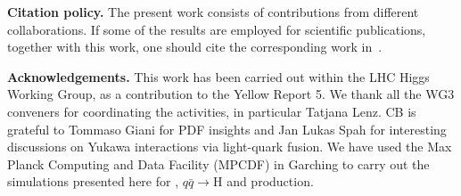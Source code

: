 \documentclass[11pt,a4paper]{article}
\begin{document}
\textbf{Citation policy. }The present work consists of contributions from different collaborations. If some of the results are employed for scientific publications, together with this work, one should cite the corresponding work in~.

\textbf{Acknowledgements. }This work has been carried out within the LHC Higgs Working Group, as a contribution to the Yellow Report 5. We thank all the WG3 conveners for coordinating the activities, in particular Tatjana Lenz. CB is grateful to Tommaso Giani for PDF insights and Jan Lukas Spah for interesting discussions on Yukawa interactions via light-quark fusion. We have used the Max Planck Computing and Data Facility (MPCDF) in Garching to carry out the \minnlo{} simulations presented here for \bbtoH{}, $q\bar q\rightarrow \text{H}$ and \bbH{} production.



\end{document}
